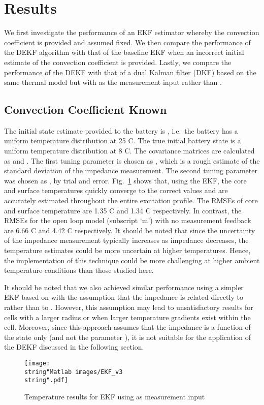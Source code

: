 \documentclass[journal, english]{IEEEtran}
\begin{document}
\section{Results}
We first investigate the performance of an EKF estimator
whereby the convection coefficient is provided and assumed fixed.
We then compare the performance of the DEKF algorithm with that of
the baseline EKF when an incorrect initial estimate of the convection
coefficient is provided. Lastly, we compare the performance of the
DEKF with that of a dual Kalman filter (DKF) based on the same thermal model but with
  as the measurement input rather than .

\subsection{Convection Coefficient Known\label{sub:Convection-Coefficient-Provided}}
The initial state estimate provided to the battery is ,
i.e.\ the battery has a uniform temperature distribution at 25 C.
The true initial battery state is a uniform temperature distribution
at 8 C. The covariance matrices are calculated as 
and .
The first tuning parameter is chosen as  , which is a rough estimate of the standard deviation of the impedance measurement. The second tuning parameter was chosen as , by trial and error.
Fig.\ \ref{fig:EKF}
shows that, using the EKF, the core and surface temperatures quickly
converge to the correct values and are accurately estimated throughout
the entire excitation profile. The RMSEs of core and surface temperature
are 1.35 C and 1.34 C respectively. In contrast,
the RMSEs for the open loop model (subscript `m') with no measurement feedback are
6.66 C and 4.42 C respectively.
It should be noted that since the uncertainty of the impedance measurement typically increases as impedance decreases, the temperature estimates could be more uncertain at higher temperatures. Hence, the implementation of this technique could be more challenging at higher ambient temperature conditions than those studied here.


It should be noted that we also achieved similar performance using
a simpler EKF based on  with the assumption that the impedance
is related directly to  rather than to 
. However, this assumption may lead to unsatisfactory
results for cells with a larger radius or when larger temperature
gradients exist within the cell. Moreover, since this approach assumes that the impedance is a function of the state only (and not the parameter ), it is not suitable for the application of the DEKF discussed in the following section.
\begin{figure}\begin{raggedright}
\texttt{[image: \\string"Matlab images/EKF\_v3\\string".pdf]}
\par\end{raggedright}
\caption{Temperature results for EKF using  as measurement input\label{fig:EKF}}
\end{figure}
\end{document}
